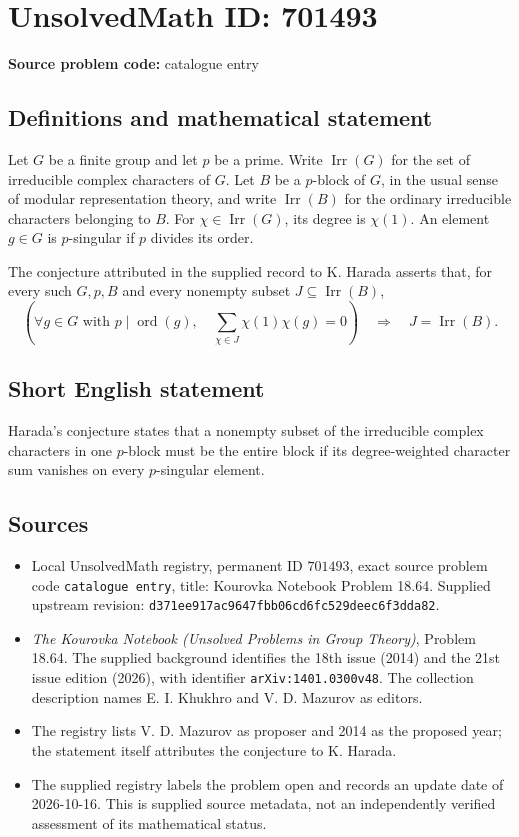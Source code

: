 \documentclass[11pt]{article}
\begin{document}
\section*{UnsolvedMath ID: 701493}
\textbf{Source problem code:} catalogue entry
\subsection{Definitions and mathematical statement}
Let \(G\) be a finite group and let \(p\) be a prime. Write \(\operatorname{Irr}(G)\) for the set of irreducible complex characters of \(G\). Let \(B\) be a \(p\)-block of \(G\), in the usual sense of modular representation theory, and write \(\operatorname{Irr}(B)\) for the ordinary irreducible characters belonging to \(B\). For \(\chi\in\operatorname{Irr}(G)\), its degree is \(\chi(1)\). An element \(g\in G\) is \(p\)-singular if \(p\) divides its order.

The conjecture attributed in the supplied record to K. Harada asserts that, for every such \(G,p,B\) and every nonempty subset \(J\subseteq\operatorname{Irr}(B)\),
\[
\left(\forall g\in G\text{ with }p\mid\operatorname{ord}(g),\quad
\sum_{\chi\in J}\chi(1)\chi(g)=0\right)
\quad\Longrightarrow\quad J=\operatorname{Irr}(B).
\]
\subsection{Short English statement}
Harada's conjecture states that a nonempty subset of the irreducible complex characters in one \(p\)-block must be the entire block if its degree-weighted character sum vanishes on every \(p\)-singular element.
\subsection{Sources}
\begin{itemize}
\item Local UnsolvedMath registry, permanent ID \(701493\), exact source problem code \texttt{catalogue entry}, title: Kourovka Notebook Problem 18.64. Supplied upstream revision: \texttt{d371ee917ac9647fbb06cd6fc529deec6f3dda82}.
\item \emph{The Kourovka Notebook (Unsolved Problems in Group Theory)}, Problem 18.64. The supplied background identifies the 18th issue (2014) and the 21st issue edition (2026), with identifier \texttt{arXiv:1401.0300v48}. The collection description names E. I. Khukhro and V. D. Mazurov as editors.
\item The registry lists V. D. Mazurov as proposer and 2014 as the proposed year; the statement itself attributes the conjecture to K. Harada.
\item The supplied registry labels the problem open and records an update date of 2026-10-16. This is supplied source metadata, not an independently verified assessment of its mathematical status.
\end{itemize}
\end{document}
